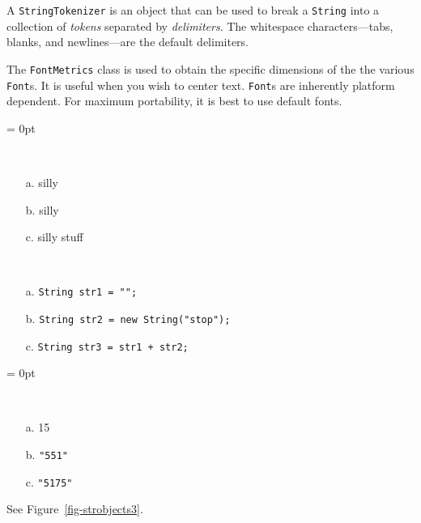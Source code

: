 \begin{SMBL}
\item  A {\tt StringTokenizer} is an object that can be used to
break a {\tt String} into a collection of {\it tokens} separated by
{\it delimiters}. The whitespace characters---tabs, blanks, and
newlines---are the default delimiters.

\item  The {\tt FontMetrics} class is used to obtain the
specific dimensions of the the various {\tt Font}s.  It
is useful when you wish to center text.  {\tt Font}s are
inherently platform dependent.  For maximum portability,
it is best to use default fonts.

\end{SMBL}

\secANSH
\begin{ANS}
\columnsep = 0pt\begin{multicols}{4}
\item \mbox{ }
\begin{enumerate}
\item[a.]  silly       
\item[b.]  silly       
\item[c.]  silly stuff 
\end{enumerate}
\end{multicols}

\item  \mbox{ }
\begin{enumerate}
\item[a.]  \verb|String str1 = "";|              
\item[b.]  \verb|String str2 = new String("stop");|
\item[c.]  \verb|String str3 = str1 + str2;|
\end{enumerate}



\columnsep = 0pt\begin{multicols}{4}
\item \mbox{ }
\begin{enumerate}
\item[a.]  15        
\item[b.]  \verb|"551"|
\item[c.]  \verb|"5175"| 
\end{enumerate}
\end{multicols}

\item  See Figure~\ref{fig-strobjects3}.
\label{ans-strobjects2}
\label{pg-ans-strobjects2}


\end{ANS}
